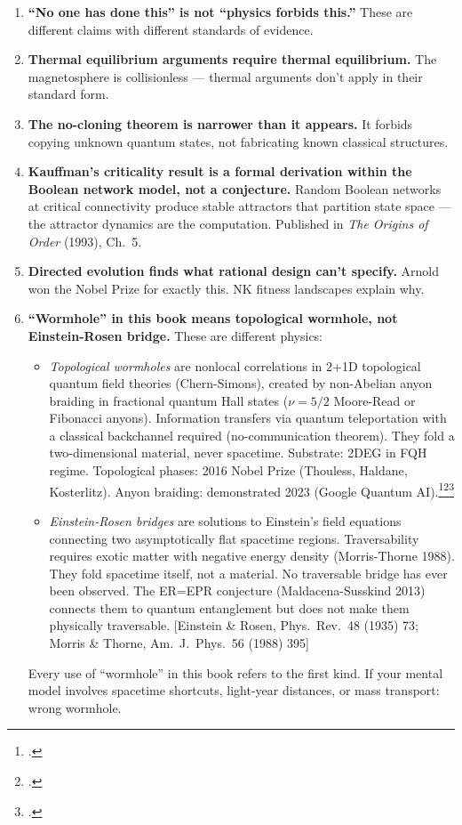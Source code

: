 \begin{enumerate}
\item \textbf{``No one has done this'' is not ``physics forbids this.''} These are different claims with different standards of evidence.
\item \textbf{Thermal equilibrium arguments require thermal equilibrium.} The magnetosphere is collisionless --- thermal arguments don't apply in their standard form.
\item \textbf{The no-cloning theorem is narrower than it appears.} It forbids copying unknown quantum states, not fabricating known classical structures.
\item \textbf{Kauffman's criticality result is a formal derivation within the Boolean network model, not a conjecture.} Random Boolean networks at critical connectivity produce stable attractors that partition state space --- the attractor dynamics are the computation. Published in \textit{The Origins of Order} (1993), Ch.~5.
\item \textbf{Directed evolution finds what rational design can't specify.} Arnold won the Nobel Prize for exactly this. NK fitness landscapes explain why.
\item \textbf{``Wormhole'' in this book means topological wormhole, not Einstein-Rosen bridge.} These are different physics:

\begin{itemize}
\item \textit{Topological wormholes} are nonlocal correlations in 2+1D topological quantum field theories (Chern-Simons), created by non-Abelian anyon braiding in fractional quantum Hall states ($\nu = 5/2$ Moore-Read or Fibonacci anyons). Information transfers via quantum teleportation with a classical backchannel required (no-communication theorem). They fold a two-dimensional material, never spacetime. Substrate: 2DEG in FQH regime. Topological phases: 2016 Nobel Prize (Thouless, Haldane, Kosterlitz). Anyon braiding: demonstrated 2023 (Google Quantum AI).\footcite{andersen2023}\footcite{nayak2008}\footcite{kitaev2003}
\item \textit{Einstein-Rosen bridges} are solutions to Einstein's field equations connecting two asymptotically flat spacetime regions. Traversability requires exotic matter with negative energy density (Morris-Thorne 1988). They fold spacetime itself, not a material. No traversable bridge has ever been observed. The ER=EPR conjecture (Maldacena-Susskind 2013) connects them to quantum entanglement but does not make them physically traversable. [Einstein \& Rosen, Phys.\ Rev.\ 48 (1935) 73; Morris \& Thorne, Am.\ J.\ Phys.\ 56 (1988) 395]
\end{itemize}

Every use of ``wormhole'' in this book refers to the first kind. If your mental model involves spacetime shortcuts, light-year distances, or mass transport: wrong wormhole.
\end{enumerate}

